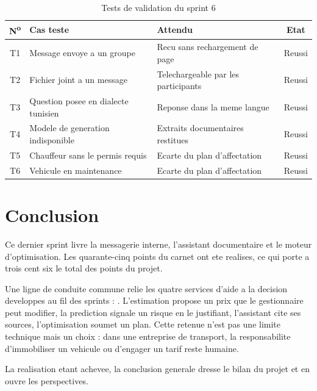 \begin{table}[H]
\centering
\caption{Tests de validation du sprint 6}
\label{tab:tests-s6}
\small
\begin{tabularx}{\textwidth}{@{}cXp{2.9cm}c@{}}
\toprule
\textbf{N\textsuperscript{o}} & \textbf{Cas teste} & \textbf{Attendu} &
\textbf{Etat} \\ \midrule
T1 & Message envoye a un groupe & Recu sans rechargement de page & Reussi \\
T2 & Fichier joint a un message & Telechargeable par les participants & Reussi \\
T3 & Question posee en dialecte tunisien & Reponse dans la meme langue & Reussi \\
T4 & Modele de generation indisponible & Extraits documentaires restitues & Reussi \\
T5 & Chauffeur sans le permis requis & Ecarte du plan d'affectation & Reussi \\
T6 & Vehicule en maintenance & Ecarte du plan d'affectation & Reussi \\
\bottomrule
\end{tabularx}
\end{table}

\section*{Conclusion}

Ce dernier sprint livre la messagerie interne, l'assistant documentaire
et le moteur d'optimisation. Les quarante-cinq points du carnet ont ete
realises, ce qui porte a trois cent six le total des points du projet.

Une ligne de conduite commune relie les quatre services d'aide a la
decision developpes au fil des sprints : . L'estimation propose un prix que le gestionnaire
peut modifier, la prediction signale un risque en le justifiant, l'assistant
cite ses sources, l'optimisation soumet un plan. Cette retenue n'est pas
une limite technique mais un choix : dans une entreprise de transport, la
responsabilite d'immobiliser un vehicule ou d'engager un tarif reste
humaine.

La realisation etant achevee, la conclusion generale dresse le bilan du
projet et en ouvre les perspectives.
